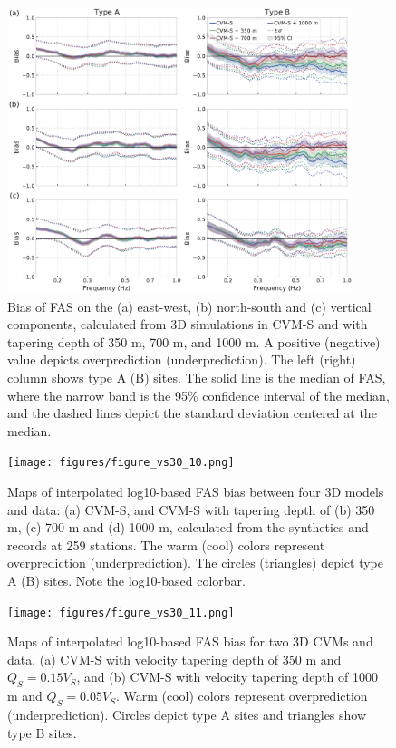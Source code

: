 \clearpage
\begin{figure}[!ht]
  \centering
  \includegraphics[width=0.9\textwidth]{figures/figure_vs30_9.pdf}
  \caption{Bias of FAS on the (a) east-west, (b) north-south and (c) vertical components, calculated from 3D simulations in CVM-S and with tapering depth of 350 m, 700 m, and 1000 m. A positive (negative) value depicts overprediction (underprediction). The left (right) column shows type A (B) sites. The solid line is the median of FAS, where the narrow band is the 95\% confidence interval of the median, and the dashed lines depict the standard deviation centered at the median.}
  \label{fig:vs30-9}
\end{figure}

\clearpage
\begin{figure}[!ht]
  \centering
  \texttt{[image: figures/figure\_vs30\_10.png]}
  \caption{Maps of interpolated log10-based FAS bias between four 3D models and data: (a) CVM-S, and CVM-S with tapering depth of (b) 350 m, (c) 700 m and (d) 1000 m, calculated from the synthetics and records at 259 stations. The warm (cool) colors represent overprediction (underprediction). The circles (triangles) depict type A (B) sites. Note the log10-based colorbar.}
  \label{fig:vs30-10}
\end{figure}

\clearpage
\begin{figure}[!ht]
  \centering
  \texttt{[image: figures/figure\_vs30\_11.png]}
  \caption{Maps of interpolated log10-based FAS bias for two 3D CVMs and data. (a) CVM-S with velocity tapering depth of 350 m and $Q_S=0.15V_S$, and (b) CVM-S with velocity tapering depth of 1000 m and $Q_S=0.05V_S$. Warm (cool) colors represent overprediction (underprediction). Circles depict type A sites and triangles show type B sites.}
  \label{fig:vs30-11}
\end{figure}

